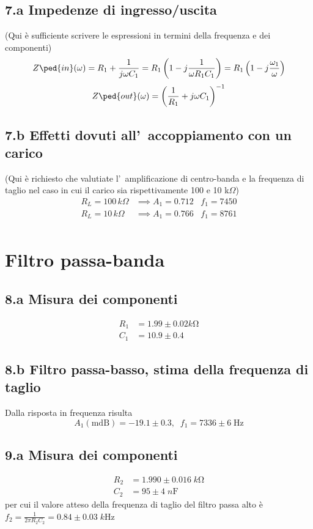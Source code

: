 \documentclass[10pt,a4paper]{article}
\begin{document}
\subsection*{7.a Impedenze di ingresso/uscita}
(Qui \`e sufficiente scrivere le espressioni in termini della frequenza e dei 
componenti)
\[
Z\ped{in}(\omega) = R_1 + \frac{1}{j \omega C_1} =
R_1 \left( 1 - j \frac{1}{\omega R_1 C_1} \right) =
R_1 \left( 1 - j \frac{\omega_1}{\omega} \right)
\]
\[
Z\ped{out}(\omega) = \left(\frac{1}{R_{1}} + j\omega C_{1}\right)^{-1}
\]

\subsection*{7.b Effetti dovuti all'~accoppiamento con un carico}
(Qui \`e richiesto che valutiate l'~amplificazione di centro-banda e la 
frequenza di taglio nel 
caso in cui il carico sia rispettivamente 100 e 10 k$\Omega$)
\[
\begin{array}{rl}
R_L=100 \,k\Omega & \implies A_1 = 0.712 \;\;\; f_1 = 7450 \\
R_L=10 \,k\Omega & \implies A_1 = 0.766\;\;\; f_1 = 8761 \\
\end{array}
\]

\section*{Filtro passa-banda}

\subsection*{8.a Misura dei componenti}
\begin{align*}
R_1 &= 1.99 \pm 0.02 \si{k\ohm} \\
C_1 &= 10.9 \pm 0.4
\end{align*}

\subsection*{8.b Filtro passa-basso, stima della frequenza di taglio}
Dalla risposta in frequenza risulta
\[
A_1(\mathrm{mdB}) = -19.1 \pm 0.3, \;\; f_1 = 7336 \pm 6 \; \si{\Hz}
\]

\subsection*{9.a Misura dei componenti}
\begin{align*}
R_2 &= 1.990 \pm 0.016 \; \si{k\ohm} \\ 
C_2 &= 95 \pm 4 \; \si{n\F}
\end{align*}
per cui il valore atteso della frequenza di taglio del filtro passa alto è
$f_2 = \frac{1}{2\pi R_2 C_2} = 0.84 \pm 0.03 \; \si{k\Hz}$
\end{document}
